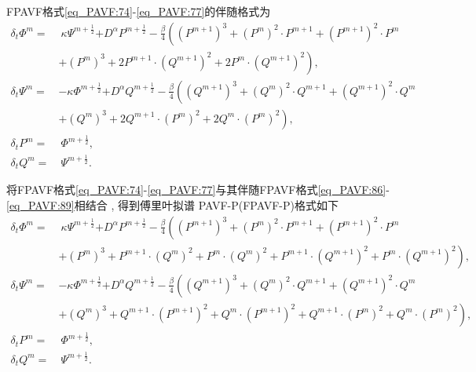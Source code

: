 FPAVF格式\eqref{eq_PAVF:74}-\eqref{eq_PAVF:77}的伴随格式为
\begin{align}
\delta_{t} \varPhi^{m}=&~\kappa \Psi^{m+\frac{1}{2}}{+D^{\alpha} P^{m+\frac{1}{2}}}-\frac{\beta}{4}\left( (P^{m+1})^3+ (P^{m})^{2}\cdot P^{m+1}+(P^{m+1})^{2}\cdot P^{m}\right . \nonumber\\
	&\left . + (P^{m})^{3}+2 P^{m+1}\cdot (Q^{m+1})^{2}+2 P^{m}\cdot (Q^{m+1})^{2}\right) , \label{eq_PAVF:86}\\
\delta_{t} \Psi^{m}=&-\kappa \varPhi^{m+\frac{1}{2}}{+D^{\alpha} Q^{m+\frac{1}{2}}}-\frac{\beta}{4}\left( (Q^{m+1})^3+ (Q^{m})^{2}\cdot Q^{m+1}+ (Q^{m+1})^{2}\cdot Q^{m}\right . \nonumber\\
	&\left . + (Q^{m})^{3}+2 Q^{m+1}\cdot (P^{m})^{2}+2 Q^{m}\cdot (P^{m})^{2}\right) , \label{eq_PAVF:87}\\
\delta_{t} P^{m}=&~\varPhi^{m+\frac{1}{2}} , \label{eq_PAVF:88}\\
\delta_{t} Q^{m}=&~\Psi^{m+\frac{1}{2}} . \label{eq_PAVF:89}
\end{align}

将FPAVF格式\eqref{eq_PAVF:74}-\eqref{eq_PAVF:77}与其伴随FPAVF格式\eqref{eq_PAVF:86}-\eqref{eq_PAVF:89}相结合 , 得到傅里叶拟谱 PAVF-P(FPAVF-P)格式如下
\begin{align}
\delta_{t} \varPhi^{m}=&~\kappa \Psi^{m+\frac{1}{2}}{+D^{\alpha} P^{m+\frac{1}{2}}}-\frac{\beta}{4}\left((P^{m+1})^3+(P^{m})^{2}\cdot P^{m+1}+(P^{m+1})^{2}\cdot P^{m}\right . \nonumber\\
	&\left . +(P^{m})^{3}+P^{m+1}\cdot (Q^{m})^{2}+P^{m}\cdot (Q^{m})^{2}+P^{m+1}\cdot (Q^{m+1})^{2}+P^{m}\cdot (Q^{m+1})^{2}\right) , \label{eq_PAVF:98}\\
\delta_{t} \Psi^{m}=&-\kappa \varPhi^{m+\frac{1}{2}}{+D^{\alpha} Q^{m+\frac{1}{2}}}-\frac{\beta}{4}\left((Q^{m+1})^3+(Q^{m})^{2}\cdot Q^{m+1}+(Q^{m+1})^{2}\cdot Q^{m}\right . \nonumber\\
	&\left . +(Q^{m})^{3}+Q^{m+1}\cdot (P^{m+1})^{2}+Q^{m}\cdot (P^{m+1})^{2}+Q^{m+1}\cdot (P^{m})^{2}+Q^{m}\cdot (P^{m})^{2}\right) , \label{eq_PAVF:99}\\
\delta_{t} P^{m}=&~\varPhi^{m+\frac{1}{2}} , \label{eq_PAVF:100}\\
\delta_{t} Q^{m}=&~\Psi^{m+\frac{1}{2}} . \label{eq_PAVF:101}
\end{align}


